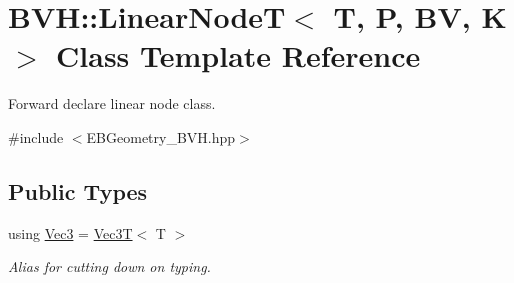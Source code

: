 \hypertarget{classBVH_1_1LinearNodeT}{}\section{B\+VH\+:\+:Linear\+NodeT$<$ T, P, BV, K $>$ Class Template Reference}
\label{classBVH_1_1LinearNodeT}


Forward declare linear node class.  




{\ttfamily \#include $<$E\+B\+Geometry\+\_\+\+B\+V\+H.\+hpp$>$}

\subsection*{Public Types}
\begin{DoxyCompactItemize}
\item 
\mbox{\label{classBVH_1_1LinearNodeT_a073e87d51d44b4cc243c8f90690247a6}} 
using \hyperlink{classBVH_1_1LinearNodeT_a073e87d51d44b4cc243c8f90690247a6}{Vec3} = \hyperlink{classVec3T}{Vec3T}$<$ T $>$
\begin{DoxyCompactList}\small\item\em Alias for cutting down on typing. \end{DoxyCompactList}\end{DoxyCompactItemize}
